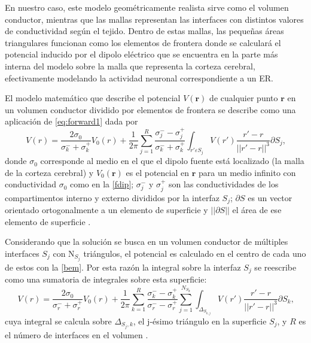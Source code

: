 En nuestro caso, este modelo geométricamente realista sirve como el volumen conductor, mientras que las mallas representan las interfaces con distintos valores de conductividad según el tejido.
Dentro de estas mallas, las pequeñas áreas triangulares funcionan como los elementos de frontera donde se calculará el potencial inducido por el dipolo eléctrico que se encuentra en la parte más interna del modelo sobre la malla que representa la corteza cerebral, efectivamente modelando la actividad neuronal correspondiente a un ER.

El modelo matemático que describe el potencial $V(\mathbf{r})$ de cualquier punto $\mathbf{r}$ en un volumen conductor dividido por elementos de frontera se describe como una aplicación de \cref{eq:forward1} dada por
\begin{equation}
	\label{bem}
	V(r) = \frac{2\sigma_{0}}{\sigma_{k}^{-} + {\sigma_{k}^{+}}} V_{0}(r) + \frac{1}{2\pi} \sum_{j=1}^{R}\frac{\sigma_{j}^{-}-\sigma_{j}^{+}}{\sigma_{k}^{-}+\sigma_{k}^{+}} \int_{r'\varepsilon S_{j}} V(r') \frac{r'-r}{||r'-r||^3}\partial S_{j}\text{,}
\end{equation}
donde $\sigma_{0}$ corresponde al medio en el que el dipolo fuente está localizado (la malla de la corteza cerebral) y $V_{0}(\mathbf{r})$ es el potencial en $\mathbf{r}$ para un medio infinito con conductividad $\sigma_{0}$ como en la \cref{fdip};
$\sigma_{j}^{-}$ y $\sigma_{j}^{+}$ son las conductividades de los compartimentos interno y externo divididos por la interfaz $S_{j}$;
$\partial S$ es un vector orientado ortogonalmente a un elemento de superficie y $||\partial S||$ el área de ese elemento de superficie \cite{Hallez2007}.

Considerando que la solución se busca en un volumen conductor de múltiples interfaces $S_{j}$ con $\text{N}_{S_j}$ triángulos, el potencial es calculado en el centro de cada uno de estos con la \cref{bem}.
Por esta razón la integral sobre la interfaz $S_{j}$ se reescribe como una sumatoria de integrales sobre esta superficie:
\begin{equation}
	\label{bem2}
	V(r) = \frac{2\sigma_{0}}{\sigma_{r}^{-} + {\sigma_{r}^{+}}} V_{0}(r) + \frac{1}{2\pi} \sum_{k=1}^{R}\frac{\sigma_{k}^{-}-\sigma_{k}^{+}}{\sigma_{r}^{-}-\sigma_{r}^{+}} \sum_{j=1}^{N_{S_{k}}} \int_{\Delta_{S_{k,j}}} V(r') \frac{r'-r}{||r'-r||^3}\partial S_{k}\text{,}
\end{equation}
cuya integral se calcula sobre $\Delta_{S_{j},k}$, el j-ésimo triángulo en la superficie $S_{j}$, y $R$ es el número de interfaces en el volumen \cite{Hallez2007}.


